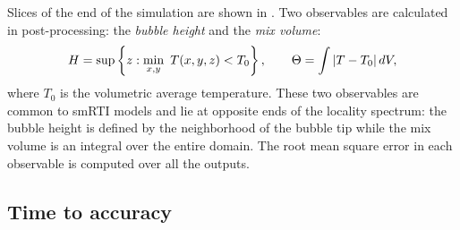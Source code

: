Slices of the end of the simulation are shown in .
Two observables are calculated in post-processing: the \textit{bubble height} and the \textit{mix volume}:
\begin{equation} \elabel{observe}
H = \sup \left\{ z : \min_{x,y} ~ T(x,y,z) < T_0\right\}, \qquad
\Theta = \int \left|T - T_0\right| dV, 
\end{equation}
where $T_0$ is the volumetric average temperature.
These two observables are common to smRTI models and lie at opposite ends of the locality spectrum: 
the bubble height is defined by the neighborhood of the bubble tip while the mix volume is an integral over the entire domain.
The root mean square error in each observable is computed over all the outputs.


\subsection{Time to accuracy}


